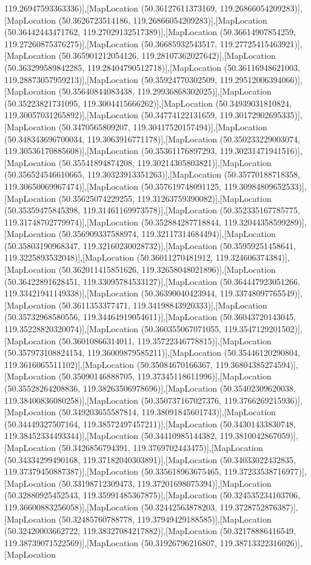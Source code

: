 119.26947593363336)],[MapLocation (50.36127611373169, 119.26866054209283)],[MapLocation (50.3626723514186, 119.26866054209283)],[MapLocation (50.36442443471762, 119.27029132517389)],[MapLocation (50.36614907854259, 119.27260875376275)],[MapLocation (50.36685932543517, 119.27725415463921)],[MapLocation (50.365901212054126, 119.28107362027642)],[MapLocation (50.363299589842285, 119.28404790512718)],[MapLocation (50.36116948621003, 119.28873057959213)],[MapLocation (50.35924770302509, 119.29512006394066)],[MapLocation (50.35640844083438, 119.29936868302025)],[MapLocation (50.35223821731095, 119.3004415666262)],[MapLocation (50.34939031810824, 119.30057031265892)],[MapLocation (50.34774122131659, 119.30172902695335)],[MapLocation (50.3470565809207, 119.30417520157494)],[MapLocation (50.348343696700034, 119.3063916771178)],[MapLocation (50.350233229003074, 119.30536170885608)],[MapLocation (50.35361176897293, 119.30231471941516)],[MapLocation (50.35541894874208, 119.30214305803821)],[MapLocation (50.356524546610665, 119.30323913351263)],[MapLocation (50.35770188718358, 119.30650069967474)],[MapLocation (50.357619748091125, 119.30984809652533)],[MapLocation (50.35625074229255, 119.31263759390082)],[MapLocation (50.35359475845398, 119.31461169973578)],[MapLocation (50.352335167785775, 119.31748702779974)],[MapLocation (50.352884287718844, 119.32044358599289)],[MapLocation (50.356909337588974, 119.32117314684494)],[MapLocation (50.35803190968347, 119.32160230028732)],[MapLocation (50.35959251458641, 119.3225893532048)],[MapLocation (50.36011270481912, 119.324606374384)],[MapLocation (50.362011415851626, 119.32658048021896)],[MapLocation (50.36422891628451, 119.33095784533127)],[MapLocation (50.364447923051266, 119.33421941149338)],[MapLocation (50.36390040423944, 119.33748097765549)],[MapLocation (50.3611353377471, 119.34198843920333)],[MapLocation (50.35732968580556, 119.34464919054611)],[MapLocation (50.36043720143045, 119.35228820320074)],[MapLocation (50.360355067071055, 119.3547129201502)],[MapLocation (50.36010866314011, 119.35722346778815)],[MapLocation (50.357973108824154, 119.36009879585211)],[MapLocation (50.35446120290804, 119.3616065511102)],[MapLocation (50.35084670166367, 119.36804385274594)],[MapLocation (50.35090146888705, 119.37345118611996)],[MapLocation (50.35528264208836, 119.38263506978696)],[MapLocation (50.35402309620038, 119.38400836080258)],[MapLocation (50.350737167027376, 119.3766269215936)],[MapLocation (50.349203655587814, 119.38091845601743)],[MapLocation (50.34449327507164, 119.38572497457211)],[MapLocation (50.34301433830748, 119.38452334493344)],[MapLocation (50.34410985144382, 119.3810042867059)],[MapLocation (50.3426856794391, 119.3769702443475)],[MapLocation (50.34334299490168, 119.37182040303891)],[MapLocation (50.34033022432835, 119.37379450887387)],[MapLocation (50.335618963675465, 119.37233538716977)],[MapLocation (50.33198712309473, 119.37201698075394)],[MapLocation (50.32880925452543, 119.35991485367875)],[MapLocation (50.324535234103706, 119.36600883256058)],[MapLocation (50.32442563878203, 119.3728752876387)],[MapLocation (50.32485760788778, 119.37949429188585)],[MapLocation (50.32420003662722, 119.38327084217882)],[MapLocation (50.32178886416549, 119.38739071522569)],[MapLocation (50.31926796216807, 119.38713322316026)],[MapLocation 